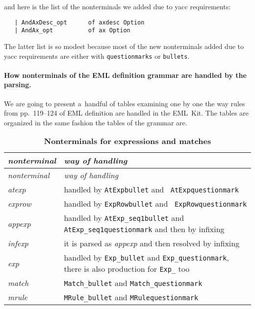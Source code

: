 \noindent and here is the list of the nonterminals we added due to yacc
requirements: 
{\small
\begin{verbatim}
   | AndAxDesc_opt      of axdesc Option
   | AndAx_opt          of ax Option
\end{verbatim}}

  The latter list is so modest because most of the new nonterminals
  added due to yacc requirements are either with {\tt questionmarks}
  or {\tt bullets}.


\paragraph{How nonterminals of the EML definition grammar are handled by
  the \EMLK parsing.}

We are going to present a~handful of tables examining one by one the
way rules from pp.~119--124 of EML definition are handled in the
EML~Kit. The tables are organized in the same fashion the tables of
the
\EMLK grammar are.

\begin{longtable}{lp{80mm}}
\caption[Nonterminals for expressions and matches]%
{\bf  Nonterminals for expressions and matches}\\
\sl nonterminal& \sl way of handling\\[5pt]
\endfirsthead
\sl nonterminal& \sl way of handling\\[5pt]
\endhead
\endfoot
{\it atexp} & handled by {\tt AtExpbullet} and {\tt
  AtExpquestionmark}\\ 
{\it exprow} & handled by {\tt ExpRowbullet} and {\tt
  ExpRowquestionmark}\\ 
{\it appexp} & handled by {\tt  AtExp\_seq1bullet} and {\tt
  AtExp\_seq1questionmark} and then by infixing\\
{\it infexp} & it is parsed as {\it appexp} and then resolved by
infixing\\
{\it exp} & handled by {\tt Exp\_bullet} and {\tt Exp\_questionmark},
there is also production for {\tt Exp\_} too\\
{\it match} & {\tt Match\_bullet} and {\tt Match\_questionmark}\\
{\it mrule} & {\tt MRule\_bullet} and {\tt MRulequestionmark}\\
\end{longtable}

